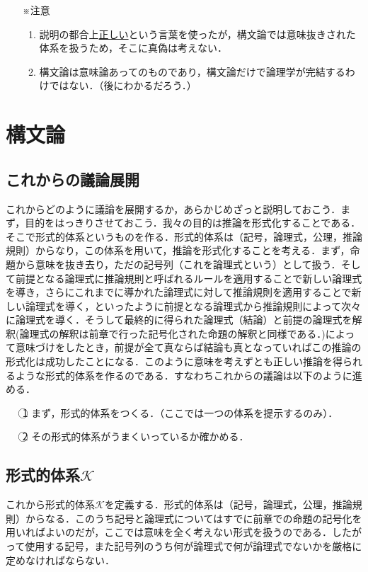 \documentclass[10pt,b5paper,papersize,dvipdfmx]{jsbook}
\begin{document}
\begin{itemize}
\item[※注意]
\begin{enumerate}
\item 説明の都合上\underline{正しい}という言葉を使ったが，構文論では意味抜きされた体系を扱うため，そこに真偽は考えない．
\item 構文論は意味論あってのものであり，構文論だけで論理学が完結するわけではない．（後にわかるだろう．）
\end{enumerate}
\end{itemize}

\section{構文論}
\subsection{これからの議論展開}
これからどのように議論を展開するか，あらかじめざっと説明しておこう．まず，目的をはっきりさせておこう．我々の目的は推論を形式化することである．そこで形式的体系というものを作る．形式的体系は（記号，論理式，公理，推論規則）からなり，この体系を用いて，推論を形式化することを考える．まず，命題から意味を抜き去り，ただの記号列（これを論理式という）として扱う．そして前提となる論理式に推論規則と呼ばれるルールを適用することで新しい論理式を導き，さらにこれまでに導かれた論理式に対して推論規則を適用することで新しい論理式を導く，といったように前提となる論理式から推論規則によって次々に論理式を導く．そうして最終的に得られた論理式（結論）と前提の論理式を解釈(論理式の解釈は前章で行った記号化された命題の解釈と同様である．)によって意味づけをしたとき，前提が全て真ならば結論も真となっていればこの推論の形式化は成功したことになる．このように意味を考えずとも正しい推論を得られるような形式的体系を作るのである．すなわちこれからの議論は以下のように進める．
\begin{itemize}
\item[\textcircled{\scriptsize 1}]まず，形式的体系をつくる．（ここでは一つの体系を提示するのみ）．
\item[\textcircled{\scriptsize 2}]その形式的体系がうまくいっているか確かめる．
\end{itemize}
\subsection{形式的体系$\mathcal K$}
これから形式的体系$\mathcal K$を定義する．形式的体系は（記号，論理式，公理，推論規則）からなる．このうち記号と論理式についてはすでに前章での命題の記号化を用いればよいのだが，ここでは意味を全く考えない形式を扱うのである．したがって使用する記号，また記号列のうち何が論理式で何が論理式でないかを厳格に定めなければならない． 
\end{document}
